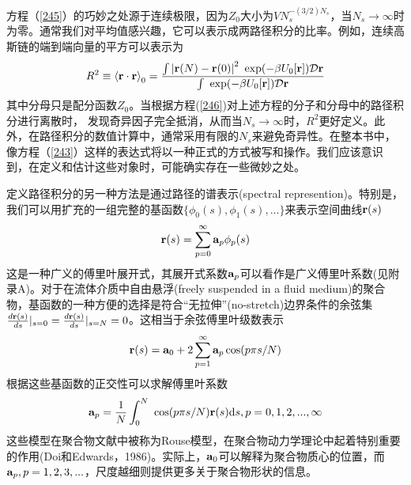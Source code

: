 方程（\ref{245}）的巧妙之处源于连续极限，因为$Z_0$大小为$VN_s^{−(3/2)N_s}$，当$N_s\rightarrow \infty$时为零。通常我们对平均值感兴趣，它可以表示成两路径积分的比率。例如，连续高斯链的端到端向量的平方可以表示为
\begin{equation}\label{246}
R^2\equiv \left \langle \mathbf{r} \cdot \mathbf{r} \right \rangle _0=\frac{\int \left| \mathbf{r} (N)-\mathbf{r} (0) \right|^2~\exp(-\beta U_0[\mathbf{r} ]) \mathcal{D} \mathbf{r} }{\int ~\exp(-\beta U_0[\mathbf{r} ]) \mathcal{D} \mathbf{r} } 
\end{equation}
其中分母只是配分函数$Z_0$。当根据方程(\ref{246})对上述方程的分子和分母中的路径积分进行离散时，
发现奇异因子完全抵消，从而当$N_s\rightarrow \infty$时，$R^2$更好定义。此外，在路径积分的数值计算中，通常采用有限的$N_s$来避免奇异性。在整本书中，像方程（\ref{243}）这样的表达式将以一种正式的方式被写和操作。我们应该意识到，在定义和估计这些对象时，可能确实存在一些微妙之处。

定义路径积分的另一种方法是通过路径的谱表示(spectral represention)。特别是，我们可以用扩充的一组完整的基函数$\lbrace \phi _0(s),\phi _1(s),... \rbrace$来表示空间曲线$\mathbf{r} (s)$
\begin{equation}\label{247}
\mathbf{r} (s)=\sum_{p=0}^{\infty} \mathbf{a} _p \phi _p(s)
\end{equation}
这是一种广义的傅里叶展开式，其展开式系数$\mathbf{a} _p$可以看作是广义傅里叶系数(见附录A)。对于在流体介质中自由悬浮(freely suspended in a fluid medium)的聚合物，基函数的一种方便的选择是符合“无拉伸”(no-stretch)边界条件的余弦集$\frac{d\mathbf{r} (s)}{ds}\vert _{s=0}=\frac{d\mathbf{r} (s)}{ds}\vert _{s=N}=0$。这相当于余弦傅里叶级数表示
\begin{equation}\label{248}
\mathbf{r} (s)=\mathbf{a} _0+2\sum_{p=1}^{\infty} \mathbf{a} _p \cos(p\pi s/N)
\end{equation}
根据这些基函数的正交性可以求解傅里叶系数
\begin{equation}\label{249}
\mathbf{a} _p=\frac{1}{N}\int_{0}^{N} ~\cos(p\pi s/N)\mathbf{r} (s) \mathrm{d}s,p=0,1,2,...,\infty
\end{equation}
这些模型在聚合物文献中被称为Rouse模型，在聚合物动力学理论中起着特别重要的作用(Doi和Edwards，1986)。实际上，$\mathbf{a} _0$可以解释为聚合物质心的位置，而$\mathbf{a} _p,p=1,2,3,...$，尺度越细则提供更多关于聚合物形状的信息。

